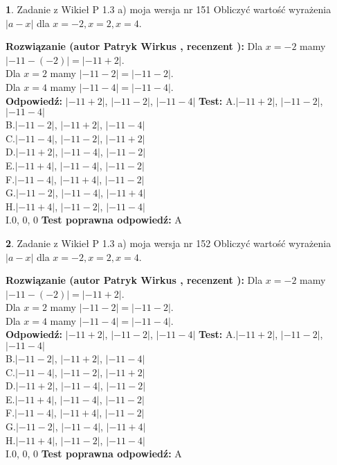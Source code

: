 \documentclass[12pt, a4paper]{article}
\theoremstyle{definition} %
\newtheorem{zad}{}
\newcommand{\zadStart}[1]{\begin{zad}#1\newline}
\newcommand{\zadStop}{\end{zad}}
\newcommand{\rozwStart}[2]{\noindent \textbf{Rozwiązanie (autor #1 , recenzent #2): }\newline}
\newcommand{\rozwStop}{\newline}
\newcommand{\odpStart}{\noindent \textbf{Odpowiedź:}\newline}
\newcommand{\odpStop}{\newline}
\newcommand{\testStart}{\noindent \textbf{Test:}\newline}
\newcommand{\testStop}{\newline}
\newcommand{\kluczStart}{\noindent \textbf{Test poprawna odpowiedź:}\newline}
\newcommand{\kluczStop}{\newline}
\begin{document}
\zadStart{Zadanie z Wikieł P 1.3 a) moja wersja nr 151}
Obliczyć wartość wyrażenia $|a - x|$ dla $x=-2,x=2,x=4$.
\zadStop
\rozwStart{Patryk Wirkus}{}
Dla $x = -2$ mamy $|-11 - (-2)| = |-11 + 2|$.\\
Dla $x = 2$ mamy $|-11 - 2| = |-11 - 2|$.\\
Dla $x = 4$ mamy $|-11 - 4| = |-11 - 4|$.\\
\rozwStop
\odpStart
$|-11 + 2|$, $|-11 - 2|$, $|-11 - 4|$
\odpStop
\testStart
A.$|-11 + 2|$, $|-11 - 2|$, $|-11 - 4|$\\
B.$|-11 - 2|$, $|-11 + 2|$, $|-11 - 4|$\\
C.$|-11 - 4|$, $|-11 - 2|$, $|-11 + 2|$\\
D.$|-11 + 2|$, $|-11 - 4|$, $|-11 - 2|$\\
E.$|-11 + 4|$, $|-11 - 4|$, $|-11 - 2|$\\
F.$|-11 - 4|$, $|-11 + 4|$, $|-11 - 2|$\\
G.$|-11 - 2|$, $|-11 - 4|$, $|-11 + 4|$\\
H.$|-11 + 4|$, $|-11 - 2|$, $|-11 - 4|$\\
I.$0$, $0$, $0$
\testStop
\kluczStart
A
\kluczStop



\zadStart{Zadanie z Wikieł P 1.3 a) moja wersja nr 152}
Obliczyć wartość wyrażenia $|a - x|$ dla $x=-2,x=2,x=4$.
\zadStop
\rozwStart{Patryk Wirkus}{}
Dla $x = -2$ mamy $|-11 - (-2)| = |-11 + 2|$.\\
Dla $x = 2$ mamy $|-11 - 2| = |-11 - 2|$.\\
Dla $x = 4$ mamy $|-11 - 4| = |-11 - 4|$.\\
\rozwStop
\odpStart
$|-11 + 2|$, $|-11 - 2|$, $|-11 - 4|$
\odpStop
\testStart
A.$|-11 + 2|$, $|-11 - 2|$, $|-11 - 4|$\\
B.$|-11 - 2|$, $|-11 + 2|$, $|-11 - 4|$\\
C.$|-11 - 4|$, $|-11 - 2|$, $|-11 + 2|$\\
D.$|-11 + 2|$, $|-11 - 4|$, $|-11 - 2|$\\
E.$|-11 + 4|$, $|-11 - 4|$, $|-11 - 2|$\\
F.$|-11 - 4|$, $|-11 + 4|$, $|-11 - 2|$\\
G.$|-11 - 2|$, $|-11 - 4|$, $|-11 + 4|$\\
H.$|-11 + 4|$, $|-11 - 2|$, $|-11 - 4|$\\
I.$0$, $0$, $0$
\testStop
\kluczStart
A
\kluczStop
\end{document}
